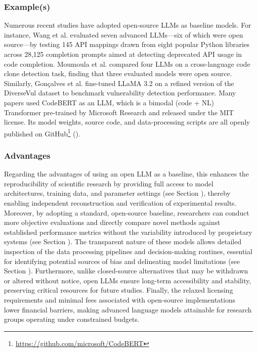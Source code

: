\subsubsection{Example(s)}

Numerous recent studies have adopted open‐source LLMs as baseline models. For instance, Wang et al. \cite{wang2024and} evaluated seven advanced LLMs---six of which were open source---by testing 145 API mappings drawn from eight popular Python libraries across 28,125 completion prompts aimed at detecting deprecated API usage in code completion. Moumoula et al. \cite{moumoula2024large} compared four LLMs on a cross-language code clone detection task, finding that three evaluated models were open source. Similarly, Gonçalves et al. \cite{gonccalves2025evaluating} fine-tuned LLaMA 3.2 on a refined version of the DiverseVul dataset to benchmark vulnerability detection performance. Many papers \cite{DBLP:journals/jss/YangZCZHC23, DBLP:conf/gaiis/XiaSD24, DBLP:conf/kbse/SonnekalbGBM22, DBLP:conf/icse/CaiYMMN24} used CodeBERT as an LLM, which is a bimodal (code + NL) Transformer pre-trained by Microsoft Research and released under the MIT license. Its model weights, source code, and data-processing scripts are all openly published on GitHub\footnote{\url{https://github.com/microsoft/CodeBERT}} (\modelversion).


\subsubsection{Advantages}

Regarding the advantages of using an open LLM as a baseline, this enhances the reproducibility of scientific research by providing full access to model architectures, training data, and parameter settings (see Section \modelversion), thereby enabling independent reconstruction and verification of experimental results. Moreover, by adopting a standard, open-source baseline, researchers can conduct more objective evaluations and directly compare novel methods against established performance metrics without the variability introduced by proprietary systems (see Section \benchmarksmetrics). The transparent nature of these models allows detailed inspection of the data processing pipelines and decision-making routines, essential for identifying potential sources of bias and delineating model limitations (see Section \limitationsmitigations). Furthermore, unlike closed-source alternatives that may be withdrawn or altered without notice, open LLMs ensure long-term accessibility and stability, preserving critical resources for future studies. Finally, the relaxed licensing requirements and minimal fees associated with open-source implementations lower financial barriers, making advanced language models attainable for research groups operating under constrained budgets.


